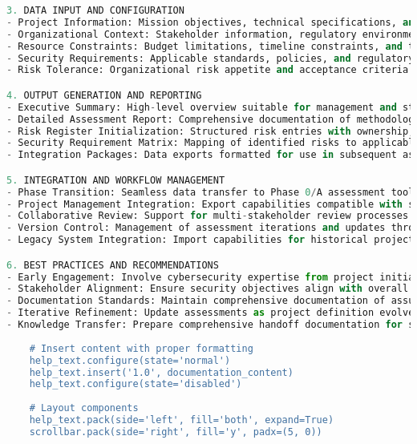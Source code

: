 \documentclass[binding=0.6cm]{sapthesis}
\begin{document}
\begin{lstlisting}[language=Python, caption=BID Tool Enhanced Help System Implementation]
3. DATA INPUT AND CONFIGURATION
- Project Information: Mission objectives, technical specifications, and operational requirements
- Organizational Context: Stakeholder information, regulatory environment, and compliance requirements  
- Resource Constraints: Budget limitations, timeline constraints, and technical capabilities
- Security Requirements: Applicable standards, policies, and regulatory mandates
- Risk Tolerance: Organizational risk appetite and acceptance criteria

4. OUTPUT GENERATION AND REPORTING
- Executive Summary: High-level overview suitable for management and stakeholder communication
- Detailed Assessment Report: Comprehensive documentation of methodology, findings, and recommendations
- Risk Register Initialization: Structured risk entries with ownership, likelihood, and impact assessments
- Security Requirement Matrix: Mapping of identified risks to applicable security standards and controls
- Integration Packages: Data exports formatted for use in subsequent assessment phases

5. INTEGRATION AND WORKFLOW MANAGEMENT
- Phase Transition: Seamless data transfer to Phase 0/A assessment tools with maintained traceability
- Project Management Integration: Export capabilities compatible with standard project management systems
- Collaborative Review: Support for multi-stakeholder review processes and approval workflows
- Version Control: Management of assessment iterations and updates throughout the BID phase
- Legacy System Integration: Import capabilities for historical project data and organizational knowledge bases

6. BEST PRACTICES AND RECOMMENDATIONS
- Early Engagement: Involve cybersecurity expertise from project initiation to ensure comprehensive coverage
- Stakeholder Alignment: Ensure security objectives align with overall project goals and constraints
- Documentation Standards: Maintain comprehensive documentation of assumptions, decisions, and rationale
- Iterative Refinement: Update assessments as project definition evolves and new information becomes available
- Knowledge Transfer: Prepare comprehensive handoff documentation for subsequent project phases"""
    
    # Insert content with proper formatting
    help_text.configure(state='normal')
    help_text.insert('1.0', documentation_content)
    help_text.configure(state='disabled')
    
    # Layout components
    help_text.pack(side='left', fill='both', expand=True)
    scrollbar.pack(side='right', fill='y', padx=(5, 0))
\end{lstlisting}
\end{document}
